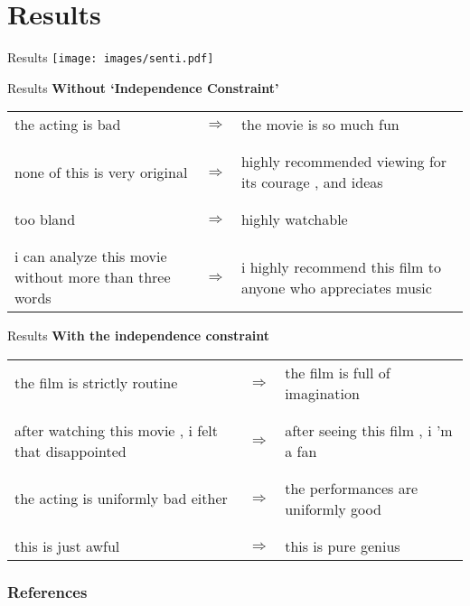 \documentclass{beamer}
\begin{document}
\section{Results}
\begin{frame}{Results}
  \centering
  \texttt{[image: images/senti.pdf]}
\end{frame}

\begin{frame}{Results}
  \centering
  \textbf{Without `Independence Constraint'}

  \vspace{0.5cm}
  
  \small
  \begin{tabular}{ p{.4\linewidth} p{.05\linewidth} p{.4\linewidth} }
    the acting is bad & $\Rightarrow$ & the movie is so much fun \\ \\ 
    \hline \\
    none of this is very original & $\Rightarrow$ & highly recommended viewing for its courage , and ideas \\ \\
    \hline \\
    too bland & $\Rightarrow$ & highly watchable \\ \\
    \hline \\
    i can analyze this movie without more than three words & $\Rightarrow$ & i highly recommend this film to anyone who appreciates music
  \end{tabular}
\end{frame}

\begin{frame}{Results}
  \centering
  {\large \textbf{With the independence constraint}}
  
  \vspace{0.5cm}

  \small
  \begin{tabular}{ p{.4\linewidth} p{.05\linewidth} p{.4\linewidth} }
    the film is strictly routine & $\Rightarrow$ & the film is full of imagination \\  \\
    \hline \\
    after watching this movie , i felt that disappointed & $\Rightarrow$ & after seeing this film , i 'm a fan \\  \\
    \hline \\
    the acting is uniformly bad either & $\Rightarrow$ & the performances are uniformly good \\  \\
    \hline \\
    this is just awful & $\Rightarrow$ & this is pure genius
  \end{tabular}
\end{frame}


\begin{frame}[shrink=20]
  \frametitle{References}
  
  {\footnotesize }
\end{frame}
\end{document}
